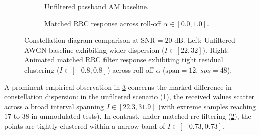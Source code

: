\documentclass[Markos_Delaportas_1316.tex]{subfiles}
\begin{document}
\begin{figure}[htbp]
    \centering

    \begin{subfigure}{0.48\linewidth}
        \caption{Unfiltered passband AM baseline.}
        \label{fig:ml_awgn_fc_const}
    \end{subfigure}%
    \hfill
    \begin{subfigure}{0.48\linewidth}
        \caption{Matched RRC response across roll-off $\alpha \in [0.0, 1.0]$.}
        \label{fig:ml_rrc_fc_const}
    \end{subfigure}

    \caption{Constellation diagram comparison at $\text{SNR} =
        20\text{ dB}$. Left: Unfiltered AWGN baseline exhibiting wider
        dispersion ($I \in [22, 32]$). Right: Animated matched RRC filter
        response exhibiting tight residual clustering ($I \in [-0.8,
    0.8]$) across roll-off $\alpha$ ($\text{span} = 12$, $sps = 48$).}
    \label{fig:ml_awgnANDrrc_fc_const}
\end{figure}

A prominent empirical observation in
\cref{fig:ml_awgnANDrrc_fc_const} concerns the marked difference in
constellation dispersion:
in the unfiltered scenario (\cref{fig:ml_awgn_fc_const}), the
received values scatter across a broad interval spanning
$I \in [22.3, 31.9]$ (with extreme samples reaching $17$ to $38$ in
unmodulated tests). In contrast, under matched \gls{rrc}
filtering (\cref{fig:ml_rrc_fc_const}), the points are tightly
clustered within a narrow band of $I \in [-0.73, 0.73]$.
\end{document}
